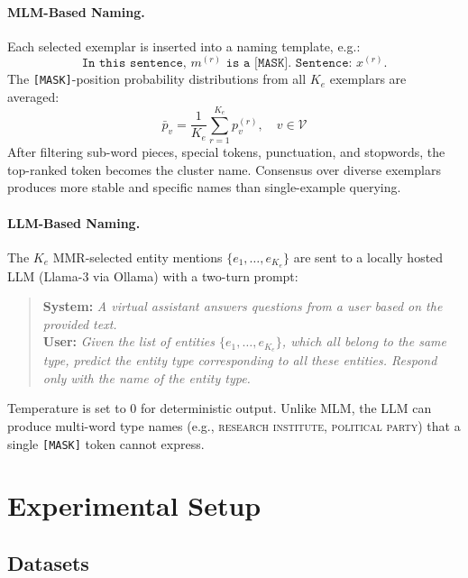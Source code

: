 \documentclass[11pt,a4paper]{article}
\begin{document}
\paragraph{MLM-Based Naming.}
Each selected exemplar is inserted into a naming template, e.g.:
\begin{equation*}
  \texttt{In this sentence, } m^{(r)} \texttt{ is a [MASK]. Sentence: } x^{(r)}.
\end{equation*}
The \texttt{[MASK]}-position probability distributions from all $K_e$ exemplars are averaged:
\begin{equation}
  \bar{p}_v = \frac{1}{K_e}\sum_{r=1}^{K_e} p_v^{(r)}, \quad v \in \mathcal{V}
\end{equation}
After filtering sub-word pieces, special tokens, punctuation, and stopwords, the top-ranked token becomes the cluster name. Consensus over diverse exemplars produces more stable and specific names than single-example querying.

\paragraph{LLM-Based Naming.}
The $K_e$ MMR-selected entity mentions $\{e_1,\ldots,e_{K_e}\}$ are sent to a locally hosted LLM (Llama-3 via Ollama) with a two-turn prompt:
\begin{quote}
\small
\textbf{System:} \textit{A virtual assistant answers questions from a user based on the provided text.}\\
\textbf{User:} \textit{Given the list of entities $\{e_1,\ldots,e_{K_e}\}$, which all belong to the same type, predict the entity type corresponding to all these entities. Respond only with the name of the entity type.}
\end{quote}
Temperature is set to 0 for deterministic output. Unlike MLM, the LLM can produce multi-word type names (e.g., \textsc{research institute}, \textsc{political party}) that a single \texttt{[MASK]} token cannot express.

\section{Experimental Setup}

\subsection{Datasets}
\end{document}
